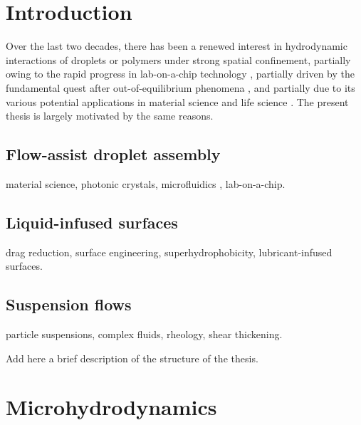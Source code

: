 \graphicspath{{imgs/}}

\chapter{Introduction}



Over the last two decades, there has been a renewed interest in hydrodynamic interactions of droplets or polymers under strong spatial confinement, partially owing to the rapid progress in lab-on-a-chip technology \citep{Squires_Quakes_2005}, partially driven by the fundamental quest after out-of-equilibrium phenomena \citep{Cui_etal_2002, Cui2004, Diamant_2005, tlusty, Davit_2008, q2d_Beatus}, and partially due to its various potential applications in material science and life science \citep{tabeling, organs-on-chips}. The present thesis is largely motivated by the same reasons.



\section{Flow-assist droplet assembly}

material science,
photonic crystals,
microfluidics \citep{Squires_Quakes_2005, microfluidics},
lab-on-a-chip.


\section{Liquid-infused surfaces}

drag reduction,
surface engineering,
superhydrophobicity,
lubricant-infused surfaces.


\section{Suspension flows}

particle suspensions,
complex fluids,
rheology,
shear thickening.

\thesisstructure Add here a brief description of the structure of the thesis.



\chapter{Microhydrodynamics}


